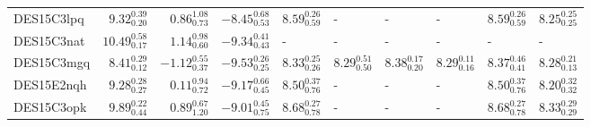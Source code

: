 \documentclass[fleqn,usenatbib,]{mnras}
\begin{document}
\begin{table}
\begin{threeparttable}
\begin{tabular}{lrrrllllll}
DES15C3lpq &   $9.32 _{\scriptscriptstyle 0.20} ^{\scriptscriptstyle 0.39}$ &   $0.86 _{\scriptscriptstyle 0.73} ^{\scriptscriptstyle 1.08}$ &   $-8.45 _{\scriptscriptstyle 0.53} ^{\scriptscriptstyle 0.68}$ &  $8.59 _{\scriptscriptstyle 0.59} ^{\scriptscriptstyle 0.26}$ &                                                             - &                                                             - &                                                             - &  $8.59 _{\scriptscriptstyle 0.59} ^{\scriptscriptstyle 0.26}$ &   $8.25 _{\scriptscriptstyle 0.25} ^{\scriptscriptstyle 0.25}$ \\
DES15C3nat &  $10.49 _{\scriptscriptstyle 0.17} ^{\scriptscriptstyle 0.58}$ &   $1.14 _{\scriptscriptstyle 0.60} ^{\scriptscriptstyle 0.98}$ &   $-9.34 _{\scriptscriptstyle 0.43} ^{\scriptscriptstyle 0.41}$ &                                                             - &                                                             - &                                                             - &                                                             - &                                                             - &                                                              - \\
DES15C3mgq &   $8.41 _{\scriptscriptstyle 0.12} ^{\scriptscriptstyle 0.29}$ &  $-1.12 _{\scriptscriptstyle 0.37} ^{\scriptscriptstyle 0.55}$ &   $-9.53 _{\scriptscriptstyle 0.25} ^{\scriptscriptstyle 0.26}$ &  $8.33 _{\scriptscriptstyle 0.26} ^{\scriptscriptstyle 0.25}$ &  $8.29 _{\scriptscriptstyle 0.50} ^{\scriptscriptstyle 0.51}$ &  $8.38 _{\scriptscriptstyle 0.20} ^{\scriptscriptstyle 0.17}$ &  $8.29 _{\scriptscriptstyle 0.16} ^{\scriptscriptstyle 0.11}$ &  $8.37 _{\scriptscriptstyle 0.41} ^{\scriptscriptstyle 0.46}$ &   $8.28 _{\scriptscriptstyle 0.13} ^{\scriptscriptstyle 0.21}$ \\
DES15E2nqh &   $9.28 _{\scriptscriptstyle 0.27} ^{\scriptscriptstyle 0.28}$ &   $0.11 _{\scriptscriptstyle 0.72} ^{\scriptscriptstyle 0.94}$ &   $-9.17 _{\scriptscriptstyle 0.45} ^{\scriptscriptstyle 0.66}$ &  $8.50 _{\scriptscriptstyle 0.76} ^{\scriptscriptstyle 0.37}$ &                                                             - &                                                             - &                                                             - &  $8.50 _{\scriptscriptstyle 0.76} ^{\scriptscriptstyle 0.37}$ &   $8.20 _{\scriptscriptstyle 0.32} ^{\scriptscriptstyle 0.32}$ \\
DES15C3opk &   $9.89 _{\scriptscriptstyle 0.44} ^{\scriptscriptstyle 0.22}$ &   $0.89 _{\scriptscriptstyle 1.20} ^{\scriptscriptstyle 0.67}$ &   $-9.01 _{\scriptscriptstyle 0.75} ^{\scriptscriptstyle 0.45}$ &  $8.68 _{\scriptscriptstyle 0.78} ^{\scriptscriptstyle 0.27}$ &                                                             - &                                                             - &                                                             - &  $8.68 _{\scriptscriptstyle 0.78} ^{\scriptscriptstyle 0.27}$ &   $8.33 _{\scriptscriptstyle 0.29} ^{\scriptscriptstyle 0.29}$ \\

\end{tabular}
\end{threeparttable}
\end{table}
\end{document}
